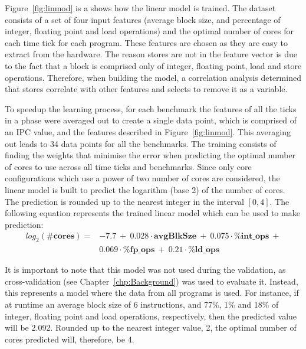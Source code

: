 Figure~\ref{fig:linmod} is a shows how the linear model is trained.
The dataset consists of a set of four input features (average block size, and percentage of integer, floating point and load operations) and the optimal number of cores for each time tick for each program.
These features are chosen as they are easy to extract from the hardware.
The reason stores are not in the feature vector is due to the fact that a block is comprised only of integer, floating point, load and store operations.
Therefore, when building the model, a correlation analysis determined that stores correlate with other features and selects to remove it as a variable.

To speedup the learning process, for each benchmark the features of all the ticks in a phase were averaged out to create a single data point, which is comprised of an IPC value, and the features described in Figure~\ref{fig:linmod}.
This averaging out leads to 34 data points for all the benchmarks.
The training consists of finding the weights that minimise the error when predicting the optimal number of cores to use across all time ticks and benchmarks.
Since only core configurations which use a power of two number of cores are considered, the linear model is built to predict the logarithm (base 2) of the number of cores.
The prediction is rounded up to the nearest integer in the interval $[0,4]$.
The following equation represents the trained linear model which can be used to make prediction:
\vspace{-1em}
\begin{align*}
  log_2(\textbf{\#cores}) = & -7.7\ +\ 0.028 \cdot \textbf{avgBlkSze}\ +\ 0.075 \cdot \textbf{\%int\_ops}\ +\\
 &0.069 \cdot \textbf{\%fp\_ops}\ +\ 0.21 \cdot \textbf{\%ld\_ops}
\end{align*}

It is important to note that this model was not used during the validation, as cross-validation (see Chapter~\ref{chp:Background}) was used to evaluate it.
Instead, this represents a model where the data from all programs is used.
For instance, if at runtime an average block size of 6 instructions, and 77\%, 1\% and 18\% of integer, floating point and load operations, respectively, then the predicted value will be 2.092.
Rounded up to the nearest integer value, 2, the optimal number of cores predicted will, therefore, be 4.

